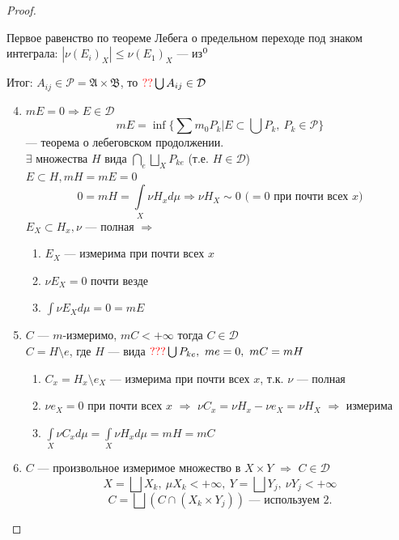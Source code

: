\documentclass[oneside]{book}
\newcommand{\A}{\mathfrak{A}}
\newcommand{\B}{\mathfrak{B}}
\theoremstyle{plain}
\theoremstyle{remark}
\theoremstyle{definition}
\begin{document}
\begin{proof}
\begin{enumerate}
\begin{enumerate}
Первое равенство по теореме Лебега о предельном переходе под знаком интеграла: \(|\nu (E_i)_X| \le \nu (E_1)_X\) --- из\(\footnotemark[\value{footnote}]\)
\end{enumerate}
\end{enumerate}
Итог: \(A_{ij} \in \mathcal{P} = \A \times \B\), то \(\color{red}??\color{black}\bigcup A_{ij} \in \mathcal{D}\)
\begin{enumerate}
\setcounter{enumi}{3}
\item \(mE = 0 \Rightarrow E \in \mathcal{D}\)
\[ mE = \inf\{\sum m_0 P_k | E \subset \bigcup P_k,\ P_k \in \mathcal{P}\} \]
--- теорема о лебеговском продолжении. \\
\(\exists\) множества \(H\) вида \(\bigcap\limits_e\bigsqcup\limits_X P_{ke}\) (т.е. \(H \in \mathcal{D}\)) \\
\(E \subset H, mH = mE = 0\)
\[ 0 = mH = \int\limits_X \nu H_x d\mu \Rightarrow \nu H_X \sim 0\text{ (\(=0\) при почти всех \(x\))} \]
\(E_X \subset H_x, \nu\) --- полная \(\Rightarrow\)
\begin{enumerate}
\item \(E_X\) --- измерима при почти всех \(x\)
\item \(\nu E_X = 0\) почти везде
\item \(\int \nu E_X d\mu = 0 = m E\)
\end{enumerate}
\item \(C\) --- \(m\)-измеримо, \(mC < + \infty\) тогда \(C \in \mathcal{D}\) \\
\(C = H \setminus e\), где \(H\) --- вида \(\color{red}???\color{black}\bigcup P_{ke},\ me = 0,\ mC = mH\)
\begin{enumerate}
\item \(C_x = H_x \setminus e_X\) --- измерима при почти всех \(x\), т.к. \(\nu\) --- полная
\item \(\nu e_X = 0\) при почти всех \(x\) \(\Rightarrow\) \(\nu C_x = \nu H_x - \nu e_X = \nu H_X\) \(\Rightarrow\) измерима
\item \(\int\limits_X \nu C_x d\mu = \int\limits_X \nu H_x d\mu = mH = mC\)
\end{enumerate}
\item \(C\) --- произвольное измеримое множество в \(X \times Y\) \(\Rightarrow\) \(C \in \mathcal{D}\) \\
\[ X = \bigsqcup X_k,\ \mu X_k < + \infty,\ Y = \bigsqcup Y_j,\ \nu Y_j < + \infty \]
\[ C = \bigsqcup (C \cap (X_k \times Y_j))\text{ --- используем 2.}\]
\end{enumerate}
\end{proof}
\end{document}
